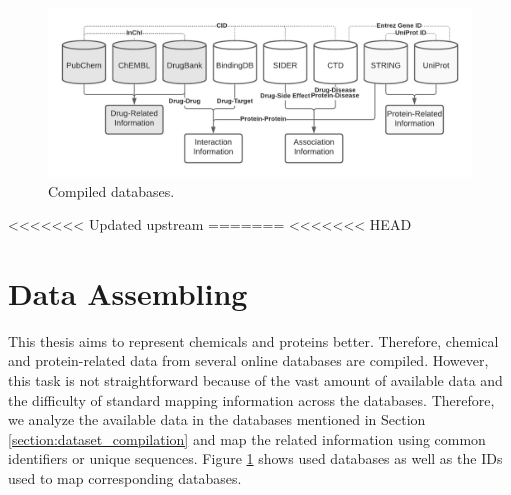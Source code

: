 \begin{figure}
    \centering
        \includegraphics[width=\linewidth]{chapters/materials_and_methods/figures/databases.png}
    \caption{Compiled databases.}
    \label{fig:databases}
\end{figure}

<<<<<<< Updated upstream
=======
<<<<<<< HEAD









\section{Data Assembling}
\label{section:data_assembling}
This thesis aims to represent chemicals and proteins better. Therefore, chemical and protein-related data from several online databases are compiled. However, this task is not straightforward because of the vast amount of available data and the difficulty of standard mapping information across the databases. Therefore, we analyze the available data in the databases mentioned in Section \ref{section:dataset_compilation} and map the related information using common identifiers or unique sequences. Figure \ref{fig:databases} shows used databases as well as the IDs used to map corresponding databases.

